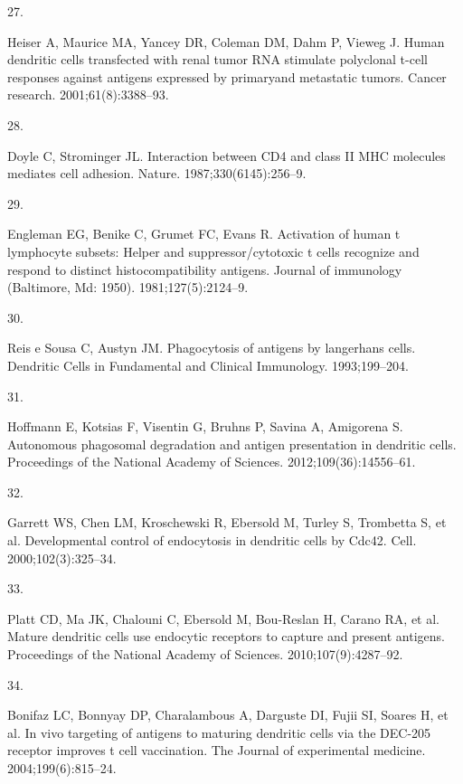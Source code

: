 \documentclass[
]{article}
\newlength{\cslhangindent}
\newlength{\csllabelwidth}
\newenvironment{CSLReferences}[2] %
 {\begin{list}{}{%
  \setlength{\itemindent}{0pt}
  \setlength{\leftmargin}{0pt}
  \setlength{\parsep}{0pt}
  \ifodd #1
   \setlength{\leftmargin}{\cslhangindent}
   \setlength{\itemindent}{-1\cslhangindent}
  \fi
  \setlength{\itemsep}{#2\baselineskip}}}
 {\end{list}}
\newcommand{\CSLLeftMargin}[1]{\parbox[t]{\csllabelwidth}{\strut#1\strut}}
\newcommand{\CSLRightInline}[1]{\parbox[t]{\linewidth - \csllabelwidth}{\strut#1\strut}}
\begin{document}
\begin{CSLReferences}{0}{1}
\CSLLeftMargin{27. }%
\CSLRightInline{Heiser A, Maurice MA, Yancey DR, Coleman DM, Dahm P,
Vieweg J. Human dendritic cells transfected with renal tumor RNA
stimulate polyclonal t-cell responses against antigens expressed by
primaryand metastatic tumors. Cancer research. 2001;61(8):3388--93. }

\CSLLeftMargin{28. }%
\CSLRightInline{Doyle C, Strominger JL. Interaction between CD4 and
class II MHC molecules mediates cell adhesion. Nature.
1987;330(6145):256--9. }

\CSLLeftMargin{29. }%
\CSLRightInline{Engleman EG, Benike C, Grumet FC, Evans R. Activation of
human t lymphocyte subsets: Helper and suppressor/cytotoxic t cells
recognize and respond to distinct histocompatibility antigens. Journal
of immunology (Baltimore, Md: 1950). 1981;127(5):2124--9. }

\CSLLeftMargin{30. }%
\CSLRightInline{Reis e Sousa C, Austyn JM. Phagocytosis of antigens by
langerhans cells. Dendritic Cells in Fundamental and Clinical
Immunology. 1993;199--204. }

\CSLLeftMargin{31. }%
\CSLRightInline{Hoffmann E, Kotsias F, Visentin G, Bruhns P, Savina A,
Amigorena S. Autonomous phagosomal degradation and antigen presentation
in dendritic cells. Proceedings of the National Academy of Sciences.
2012;109(36):14556--61. }

\CSLLeftMargin{32. }%
\CSLRightInline{Garrett WS, Chen LM, Kroschewski R, Ebersold M, Turley
S, Trombetta S, et al. Developmental control of endocytosis in dendritic
cells by Cdc42. Cell. 2000;102(3):325--34. }

\CSLLeftMargin{33. }%
\CSLRightInline{Platt CD, Ma JK, Chalouni C, Ebersold M, Bou-Reslan H,
Carano RA, et al. Mature dendritic cells use endocytic receptors to
capture and present antigens. Proceedings of the National Academy of
Sciences. 2010;107(9):4287--92. }

\CSLLeftMargin{34. }%
\CSLRightInline{Bonifaz LC, Bonnyay DP, Charalambous A, Darguste DI,
Fujii SI, Soares H, et al. In vivo targeting of antigens to maturing
dendritic cells via the DEC-205 receptor improves t cell vaccination.
The Journal of experimental medicine. 2004;199(6):815--24. }


\end{CSLReferences}
\end{document}
